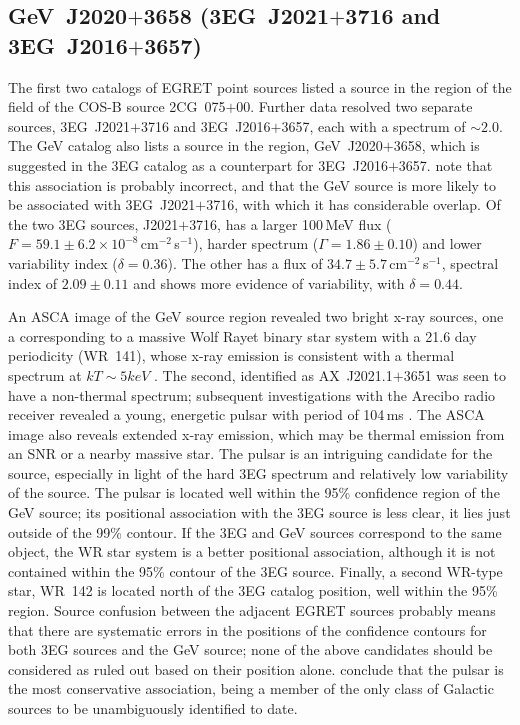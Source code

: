 \subsection{GeV~J2020$+$3658 (3EG~J2021$+$3716 and 3EG~J2016$+$3657)}

The first two catalogs of EGRET point sources listed a \Gray source in
the region of the field of the COS-B source 2CG~075$+$00. Further data
resolved two separate sources, 3EG~J2021$+$3716 and 3EG~J2016$+$3657,
each with a spectrum of $\sim2.0$. The GeV catalog also lists a
source in the region, GeV~J2020$+$3658, which is suggested in the 3EG
catalog as a counterpart for
3EG~J2016$+$3657. \citet{REF::ROBERTS::APJS2001} note that this
association is probably incorrect, and that the GeV source is more
likely to be associated with 3EG~J2021$+$3716, with which it has
considerable overlap. Of the two 3EG sources, J2021$+$3716, has a
larger 100\,MeV flux
($F=59.1\pm6.2\times10^{-8}$\,cm$^{-2}$\,s$^{-1}$), harder spectrum
($\Gamma=1.86\pm0.10$) and lower variability index
($\delta=0.36$). The other has a flux of
$34.7\pm5.7$\,cm$^{-2}$\,s$^{-1}$, spectral index of $2.09\pm0.11$
and shows more evidence of variability, with $\delta=0.44$.

An ASCA image of the GeV source region revealed two bright x-ray
sources, one a corresponding to a massive Wolf Rayet binary star
system with a 21.6 day periodicity (WR~141), whose x-ray emission is
consistent with a thermal spectrum at $kT\sim5keV$
\citep{REF::ROBERTS::APJS2001}. The second, identified as
AX~J2021.1$+$3651 was seen to have a non-thermal spectrum; subsequent
investigations with the Arecibo radio receiver revealed a young,
energetic pulsar with period of 104\,ms \citep{REF::ROBERTS::APJ2002}.
The ASCA image also reveals extended x-ray emission, which may be
thermal emission from an SNR or a nearby massive star. The pulsar is
an intriguing candidate for the \Gray source, especially in light of
the hard 3EG spectrum and relatively low variability of the source.
The pulsar is located well within the 95\% confidence region of the
GeV source; its positional association with the 3EG source is less
clear, it lies just outside of the 99\% contour. If the 3EG and GeV
sources correspond to the same object, the WR star system is a better
positional association, although it is not contained within the 95\%
contour of the 3EG source. Finally, a second WR-type star, WR~142 is
located north of the 3EG catalog position, well within the 95\%
region. Source confusion between the adjacent EGRET sources probably
means that there are systematic errors in the positions of the
confidence contours for both 3EG sources and the GeV source; none of
the above candidates should be considered as ruled out based on their
position alone. \citet{REF::ROBERTS::APJ2002} conclude that the pulsar
is the most conservative association, being a member of the only class
of Galactic \Gray sources to be unambiguously identified to date.

